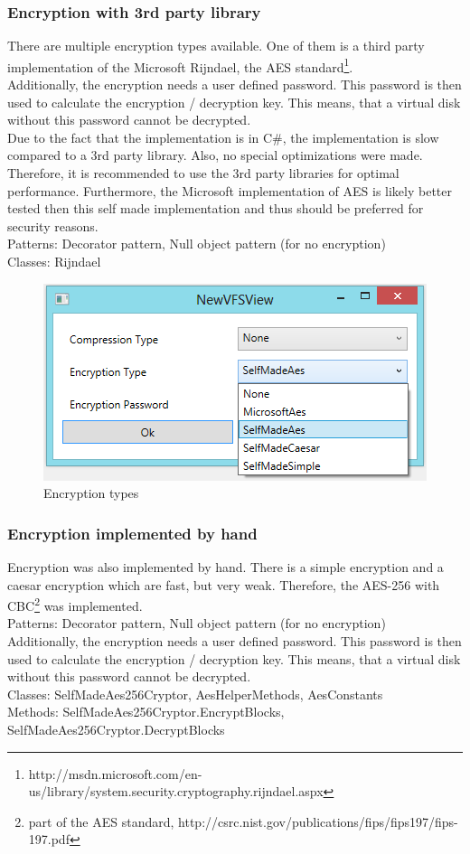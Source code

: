 \documentclass[JCDReport.tex]{subfiles}
\begin{document}
\subsubsection{Encryption with 3rd party library}
There are multiple encryption types available. One of them is a third party implementation of the Microsoft Rijndael, the AES standard\footnote{http://msdn.microsoft.com/en-us/library/system.security.cryptography.rijndael.aspx}.\\
Additionally, the encryption needs a user defined password. This password is then used to calculate the encryption / decryption key. This means, that a virtual disk without this password cannot be decrypted.\\
Due to the fact that the implementation is in C#, the implementation is slow compared to a 3rd party library. Also, no special optimizations were made. Therefore, it is recommended to use the 3rd party libraries for optimal performance. Furthermore, the Microsoft implementation of AES is likely better tested then this self made implementation and thus should be preferred for security reasons.\\
Patterns: Decorator pattern, Null object pattern (for no encryption)\\
Classes: Rijndael\\
\begin{figure}[h!]
	\centering
	\includegraphics[scale=1]{Images/encryption_types.png} 
	\caption{Encryption types}
\end{figure}

\subsubsection{Encryption implemented by hand}
Encryption was also implemented by hand. There is a simple encryption and a caesar encryption which are fast, but very weak. Therefore, the AES-256 with CBC\footnote{part of the AES standard, http://csrc.nist.gov/publications/fips/fips197/fips-197.pdf} was implemented.\\
Patterns: Decorator pattern, Null object pattern (for no encryption)\\
Additionally, the encryption needs a user defined password. This password is then used to calculate the encryption / decryption key. This means, that a virtual disk without this password cannot be decrypted.\\
Classes: SelfMadeAes256Cryptor, AesHelperMethods, AesConstants\\
Methods: SelfMadeAes256Cryptor.EncryptBlocks, SelfMadeAes256Cryptor.DecryptBlocks
\end{document}
